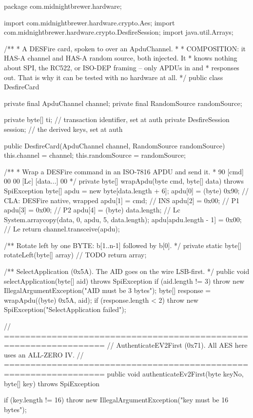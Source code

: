 \begin{jcode}
package com.midnightbrewer.hardware;

import com.midnightbrewer.hardware.crypto.Aes;
import com.midnightbrewer.hardware.crypto.DesfireSession;
import java.util.Arrays;

/**
 * A DESFire card, spoken to over an ApduChannel.
 *
 * COMPOSITION: it HAS-A channel and HAS-A random source, both injected. It
 * knows nothing about SPI, the RC522, or ISO-DEP framing -- only APDUs in and
 * responses out. That is why it can be tested with no hardware at all.
 */
public class DesfireCard {

    private final ApduChannel channel;
    private final RandomSource randomSource;

    private byte[] ti;                 // transaction identifier, set at auth
    private DesfireSession session;    // the derived keys, set at auth

    public DesfireCard(ApduChannel channel, RandomSource randomSource) {
        this.channel = channel;
        this.randomSource = randomSource;
    }

    /**
     * Wrap a DESFire command in an ISO-7816 APDU and send it.
     *   90 [cmd] 00 00 [Lc] [data...] 00
     */
    private byte[] wrapApdu(byte cmd, byte[] data) throws SpiException {
        byte[] apdu = new byte[data.length + 6];
        apdu[0] = (byte) 0x90;              // CLA: DESFire native, wrapped
        apdu[1] = cmd;                      // INS
        apdu[2] = 0x00;                     // P1
        apdu[3] = 0x00;                     // P2
        apdu[4] = (byte) data.length;       // Lc
        System.arraycopy(data, 0, apdu, 5, data.length);
        apdu[apdu.length - 1] = 0x00;       // Le
        return channel.transceive(apdu);
    }

    /** Rotate left by one BYTE: b[1..n-1] followed by b[0]. */
    private static byte[] rotateLeft(byte[] array) {
        // TODO
        return array;
    }

    /** SelectApplication (0x5A). The AID goes on the wire LSB-first. */
    public void selectApplication(byte[] aid) throws SpiException {
        if (aid.length != 3) {
            throw new IllegalArgumentException("AID must be 3 bytes");
        }
        byte[] response = wrapApdu((byte) 0x5A, aid);
        if (response.length < 2) {
            throw new SpiException("SelectApplication failed");
        }
    }

    // =================================================================
    // AuthenticateEV2First (0x71). All AES here uses an ALL-ZERO IV.
    // =================================================================
    public void authenticateEv2First(byte keyNo, byte[] key) throws SpiException {
        if (key.length != 16) {
            throw new IllegalArgumentException("key must be 16 bytes");
        }

}}
\end{jcode}
